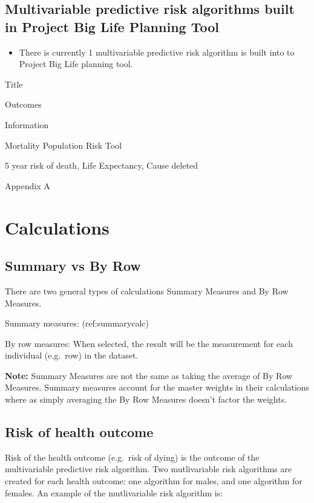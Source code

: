 \documentclass[]{book}
\providecommand{\tightlist}{%
  \setlength{\itemsep}{0pt}\setlength{\parskip}{0pt}}
\begin{document}
\subsection{Multivariable predictive risk algorithms built in Project
Big Life Planning
Tool}\label{multivariable-predictive-risk-algorithms-built-in-project-big-life-planning-tool}

\begin{itemize}
\tightlist
\item
  There is currently 1 multivariable predictive risk algorithm is built
  into to Project Big Life planning tool.
\end{itemize}

Title

Outcomes

Information

Mortality Population Risk Tool

5 year risk of death, Life Expectancy, Cause deleted

Appendix A

\section{Calculations}\label{calculations}

\subsection{Summary vs By Row}\label{summary-vs-by-row}

There are two general types of calculations Summary Measures and By Row
Measures.

Summary measures: (ref:summarycalc)

By row measures: When selected, the result will be the measurement for
each individual (e.g.~row) in the dataset.

\textbf{Note:} Summary Measures are not the same as taking the average
of By Row Measures. Summary measures account for the master weights in
their calculations where as simply averaging the By Row Measures doesn't
factor the weights.

\subsection{Risk of health outcome}\label{risk-of-health-outcome}

Risk of the health outcome (e.g.~risk of dying) is the outcome of the
multivariable predictive risk algorithm. Two mutlivariable risk
algorithms are created for each health outcome: one algorithm for males,
and one algorithm for females. An example of the mutlivariable risk
algorithm is:
\end{document}
